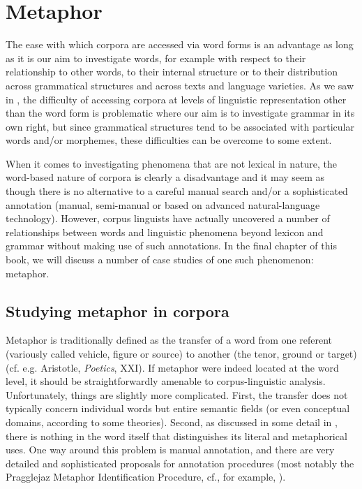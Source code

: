 \chapter{Metaphor}
\label{ch:metaphorandmetonymy}

The ease with which corpora are accessed via word forms is an advantage as long as it is our aim to investigate words, for example with respect to their relationship to other words, to their internal structure or to their distribution  across grammatical  structures and across texts and language varieties.  As we saw in , the difficulty of accessing corpora at levels of linguistic representation other than the word form is problematic where our aim is to investigate grammar in its own right, but since grammatical structures tend to be associated  with particular words and\slash or morphemes,  these difficulties can be overcome to some extent.

When it comes to investigating phenomena that are not lexical in nature, the word\hyp{}based nature of corpora is clearly a disadvantage and it may seem as though there is no alternative to a careful manual  search and\slash or a sophisticated annotation  (manual, semi\hyp{}manual or based on advanced natural\hyp{}language technology). However, corpus linguists have actually uncovered a number of relationships between words and linguistic phenomena beyond lexicon  and grammar  without making use of such annotations.  In the final chapter of this book, we will discuss a number of case studies of one such phenomenon: metaphor.

\section{Studying metaphor in corpora}
\label{sec:studyingmetaphorincorpora}

Metaphor  is traditionally defined as the transfer of a word from one referent (variously called vehicle, figure or source) to another (the tenor, ground or target) (cf. e.g. Aristotle, \textit{Poetics}, XXI). If metaphor were indeed located at the word level, it should be straightforwardly amenable to corpus\hyp{}linguistic analysis. Unfortunately, things are slightly more complicated. First, the transfer does not typically concern individual words but entire semantic  fields (or even conceptual  domains, according to some theories). Second, as discussed in some detail in , there is nothing in the word itself that distinguishes its literal  and metaphorical uses. One way around this problem is manual  annotation,  and there are very detailed and sophisticated proposals for annotation procedures (most notably the Pragglejaz Metaphor Identification Procedure, cf., for example, \citealt{low_pragglejaz_2010}).

